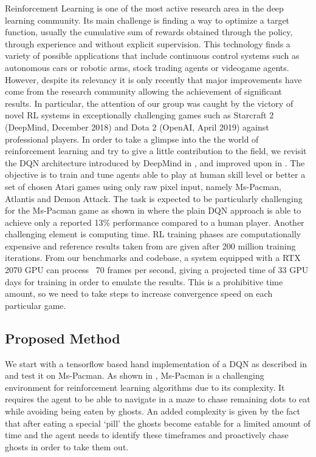 \documentclass[10pt,twocolumn,letterpaper]{article}
\begin{document}
Reinforcement Learning is one of the most active research area in the deep learning community. Its main challenge is finding a way to optimize a target function, usually the cumulative sum of rewards obtained through the policy, through experience and without explicit supervision. This technology finds a variety of possible applications that include continuous control systems such as autonomous cars or robotic arms, stock trading agents or videogame agents. However, despite its relevancy it is only recently that major improvements have come from the research community allowing the achievement of significant results.
In particular, the attention of our group was caught by the victory of novel RL systems in exceptionally challenging games such as Starcraft 2 (DeepMind, December 2018) and Dota 2 (OpenAI, April 2019) against professional players. In order to take a glimpse into the the world of reinforcement learning and try to give a little contribution to the field, we revisit the DQN architecture introduced by DeepMind in \cite{DBLP:journals/corr/MnihKSGAWR13}, and improved upon in \cite{DBLP:journals/corr/abs-1710-02298}. The objective is to train and tune agents able to play at human skill level or better a set of chosen Atari games using only raw pixel input, namely Ms-Pacman, Atlantis and Demon Attack. The task is expected to be particularly challenging for the Ms-Pacman game as shown in \cite{humancontrol} where the plain DQN approach is able to achieve only a reported 13\% performance compared to a human player.
Another challenging element is computing time. RL training phases are computationally expensive and reference results taken from \cite{DBLP:journals/corr/abs-1710-02298} are given after 200 million training iterations. From our benchmarks and codebase, a system equipped with a RTX 2070 GPU can process ~70 frames per second, giving a projected time of 33 GPU days for training in order to emulate the results. This is a prohibitive time amount, so we need to take steps to increase convergence speed on each particular game.


\subsection{Proposed Method}

We start with a tensorflow based hand implementation of a DQN as described in \cite{DBLP:journals/corr/MnihKSGAWR13} and test it on Ms-Pacman. As shown in \cite{humancontrol}, Ms-Pacman is a challenging environment for reinforcement learning algorithms due to its complexity. It requires the agent to be able to navigate in a maze to chase remaining dots to eat while avoiding being eaten by ghosts. An added complexity is given by the fact that after eating a special `pill' the ghosts become eatable for a limited amount of time and the agent needs to identify these timeframes and proactively chase ghosts in order to take them out.
\end{document}
